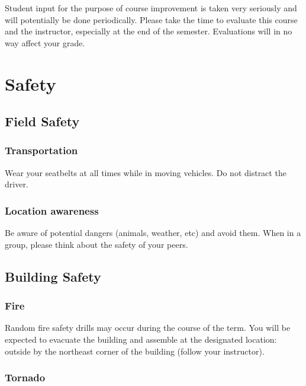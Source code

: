 \documentclass[11pt,]{article}
\begin{document}
Student input for the purpose of course improvement is taken very
seriously and will potentially be done periodically. Please take the
time to evaluate this course and the instructor, especially at the end
of the semester. Evaluations will in no way affect your grade.

\section{Safety}\label{safety}

\subsection{Field Safety}\label{field-safety}

\subsubsection{Transportation}\label{transportation}

Wear your seatbelts at all times while in moving vehicles. Do not
distract the driver.

\subsubsection{Location awareness}\label{location-awareness}

Be aware of potential dangers (animals, weather, etc) and avoid them.
When in a group, please think about the safety of your peers.

\subsection{Building Safety}\label{building-safety}

\subsubsection{Fire}\label{fire}

Random fire safety drills may occur during the course of the term. You
will be expected to evacuate the building and assemble at the designated
location: outside by the northeast corner of the building (follow your
instructor).

\subsubsection{Tornado}\label{tornado}
\end{document}
